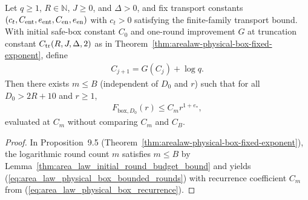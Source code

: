 \begin{lemma}
    \label{thm:area_law_physical_box_bounded_rounds}
    \leanok
    Let $q\ge1$, $R\in\mathbb N$, $J\ge0$, and $\Delta>0$, and fix transport
    constants $(c_t,C_{\rm ent},e_{\rm ent},C_{\rm en},e_{\rm en})$ with $c_t>0$
    satisfying the finite-family transport bound. With initial safe-box constant
    $C_0$ and one-round improvement $G$ at truncation constant
    $C_{\rm tr}(R,J,\Delta,2)$ as in
    Theorem~\ref{thm:arealaw-physical-box-fixed-exponent}, define
    \begin{align}
        C_{j+1}=G(C_j)+\log q.
        \label{eq:area_law_physical_box_recurrence}
    \end{align}
    Then there exists $m\le B$ (independent of $D_0$ and $r$) such that for all
    $D_0>2R+10$ and $r\ge1$,
    \begin{align}
        F_{\mathrm{box},D_0}(r)\le C_m r^{1+e_*},
        \label{eq:area_law_physical_box_bounded_rounds}
    \end{align}
    evaluated at $C_m$ without comparing $C_m$ and $C_B$.
\end{lemma}
\begin{proof}\leanok
    In Proposition~9.5 \cite[lines~788--805]{OpenAI2026AreaLaw}
    (Theorem~\ref{thm:arealaw-physical-box-fixed-exponent}), the logarithmic
    round count $m$ satisfies $m\le B$ by
    Lemma~\ref{thm:area_law_initial_round_budget_bound} and yields
    (\ref{eq:area_law_physical_box_bounded_rounds}) with recurrence coefficient
    $C_m$ from (\ref{eq:area_law_physical_box_recurrence}).
\end{proof}
